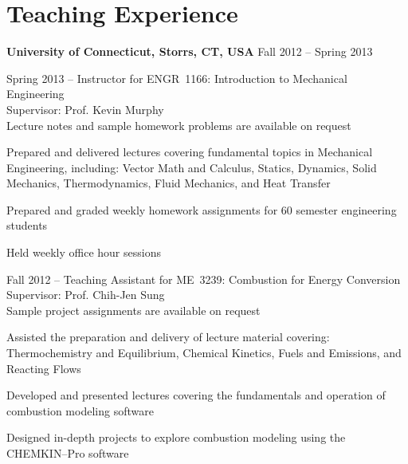 \section{Teaching Experience}
\textbf{University of Connecticut, Storrs, CT, USA} \hfill Fall 2012 --
                                                           Spring 2013
\begin{outerlist}
    \item[] Spring 2013 -- Instructor for ENGR~1166: Introduction to
            Mechanical Engineering\\
            Supervisor: Prof. Kevin Murphy\\
            Lecture notes and sample homework problems are
            available on request
        \begin{innerlist}
            \item Prepared and delivered lectures covering fundamental
                  topics in Mechanical Engineering, including: Vector
                  Math and Calculus, Statics, Dynamics, Solid
                  Mechanics, Thermodynamics, Fluid Mechanics, and Heat
                  Transfer
            \item Prepared and graded weekly homework assignments for
                  60  semester engineering students
            \item Held weekly office hour sessions
        \end{innerlist}

   \item[] Fall 2012 -- Teaching Assistant for ME~3239: Combustion for
           Energy Conversion\\
           Supervisor: Prof. Chih-Jen Sung\\
           Sample project assignments are available on request
        \begin{innerlist}
            \item Assisted the preparation and delivery of lecture
                  material covering: Thermochemistry and Equilibrium,
                  Chemical Kinetics, Fuels and Emissions, and Reacting
                  Flows
            \item Developed and presented lectures covering the
                  fundamentals and operation of combustion modeling
                  software
            \item Designed in-depth projects to explore combustion
                  modeling using the \\
                  CHEMKIN--Pro software
        \end{innerlist}

\end{outerlist}

